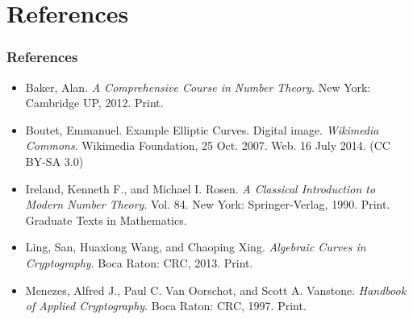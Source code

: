\documentclass{beamer}
\begin{document}
    \section{References}
    \begin{frame} %
        \frametitle{References}
        \begin{itemize}
            \item Baker, Alan. \emph{A Comprehensive Course in Number Theory}.
                New York: Cambridge UP, 2012. Print.
            \item Boutet, Emmanuel. Example Elliptic Curves. Digital image.
                \emph{Wikimedia Commons}.
                Wikimedia Foundation, 25 Oct. 2007.
                Web. 16 July 2014. (CC BY-SA 3.0)
            \item Ireland, Kenneth F., and Michael I. Rosen. \emph{A Classical
                Introduction to Modern Number Theory}. Vol. 84. New York:
                Springer-Verlag, 1990. Print. Graduate Texts in Mathematics.
            \item Ling, San, Huaxiong Wang, and Chaoping Xing. \emph{Algebraic
                Curves in Cryptography}. Boca Raton: CRC, 2013. Print.
            \item Menezes, Alfred J., Paul C. Van Oorschot, and
                Scott A. Vanstone. \emph{Handbook of Applied Cryptography}.
                Boca Raton: CRC, 1997. Print.
        \end{itemize}
    \end{frame}
\end{document}
